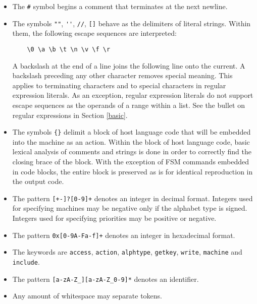 \documentclass[letterpaper,11pt,oneside]{book}
\begin{document}
\begin{itemize}

\item The \verb|#| symbol begins a comment that terminates at the next newline.

\item The symbols \verb|""|, \verb|''|, \verb|//|, \verb|[]| behave as the
delimiters of literal strings. Within them, the following escape sequences 
are interpreted: 

\verb|    \0 \a \b \t \n \v \f \r|

A backslash at the end of a line joins the following line onto the current. A
backslash preceding any other character removes special meaning. This applies
to terminating characters and to special characters in regular expression
literals. As an exception, regular expression literals do not support escape
sequences as the operands of a range within a list. See the bullet on regular
expressions in Section \ref{basic}.

\item The symbols \verb|{}| delimit a block of host language code that will be
embedded into the machine as an action.  Within the block of host language
code, basic lexical analysis of comments and strings is done in order to
correctly find the closing brace of the block. With the exception of FSM
commands embedded in code blocks, the entire block is preserved as is for
identical reproduction in the output code.

\item The pattern \verb|[+-]?[0-9]+| denotes an integer in decimal format.
Integers used for specifying machines may be negative only if the alphabet type
is signed. Integers used for specifying priorities may be positive or negative.

\item The pattern \verb|0x[0-9A-Fa-f]+| denotes an integer in hexadecimal
format.

\item The keywords are \verb|access|, \verb|action|, \verb|alphtype|,
\verb|getkey|, \verb|write|, \verb|machine| and \verb|include|.

\item The pattern \verb|[a-zA-Z_][a-zA-Z_0-9]*| denotes an identifier.


\item Any amount of whitespace may separate tokens.

\end{itemize}
\end{document}

